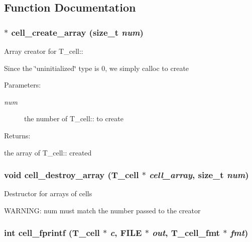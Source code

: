 \subsection{Function Documentation}
\subsubsection{$\ast$ cell\_\-create\_\-array (size\_\-t {\em num})}\label{table_8h_a22}


Array creator for T\_\-cell::

Since the \char`\"{}uninitialized\char`\"{} type is 0, we simply calloc to create\begin{Desc}
\item[Parameters: ]\par
\begin{description}
\item[{\em 
num}]the number of T\_\-cell:: to create \end{description}
\end{Desc}
\begin{Desc}
\item[Returns: ]\par
the array of T\_\-cell:: created \end{Desc}
\subsubsection{\setlength{\rightskip}{0pt plus 5cm}void cell\_\-destroy\_\-array ({\bf T\_\-cell} $\ast$ {\em cell\_\-array}, size\_\-t {\em num})}\label{table_8h_a23}


Destructor for arrays of cells

WARNING: num must match the number passed to the creator 
\subsubsection{\setlength{\rightskip}{0pt plus 5cm}int cell\_\-fprintf ({\bf T\_\-cell} $\ast$ {\em c}, FILE $\ast$ {\em out}, {\bf T\_\-cell\_\-fmt} $\ast$ {\em fmt})}\label{table_8h_a25}


